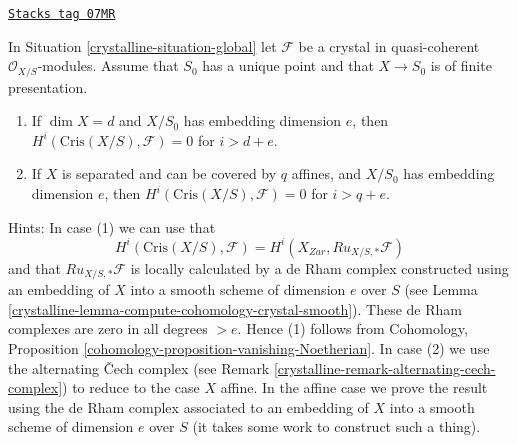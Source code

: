\begin{remark}

\label{crystalline-remark-bounded-cohomology-over-point}
\href{https://stacks.math.columbia.edu/tag/07MR}{\texttt{Stacks tag 07MR}}

In Situation \ref{crystalline-situation-global} let $\mathcal{F}$ be a crystal in
quasi-coherent $\mathcal{O}_{X/S}$-modules. Assume that $S_0$
has a unique point and that $X \to S_0$ is of finite presentation.
\begin{enumerate}
\item If $\dim X = d$ and $X/S_0$ has embedding dimension $e$, then
$H^i(\text{Cris}(X/S), \mathcal{F}) = 0$ for $i > d + e$.
\item If $X$ is separated and can be covered by $q$ affines, and
$X/S_0$ has embedding dimension $e$, then
$H^i(\text{Cris}(X/S), \mathcal{F}) = 0$ for $i > q + e$.
\end{enumerate}
Hints: In case (1) we can use that
$$
H^i(\text{Cris}(X/S), \mathcal{F}) = H^i(X_{Zar}, Ru_{X/S, *}\mathcal{F})
$$
and that $Ru_{X/S, *}\mathcal{F}$ is locally calculated by a de Rham
complex constructed using an embedding of $X$ into a smooth scheme
of dimension $e$ over $S$
(see Lemma \ref{crystalline-lemma-compute-cohomology-crystal-smooth}).
These de Rham complexes are zero in all degrees $> e$. Hence (1)
follows from Cohomology, Proposition
\ref{cohomology-proposition-vanishing-Noetherian}.
In case (2) we use the alternating {\v C}ech complex (see
Remark \ref{crystalline-remark-alternating-cech-complex}) to reduce to the case
$X$ affine. In the affine case we prove the result using the de Rham complex
associated to an embedding of $X$ into a smooth scheme of dimension $e$
over $S$ (it takes some work to construct such a thing).
\end{remark}

